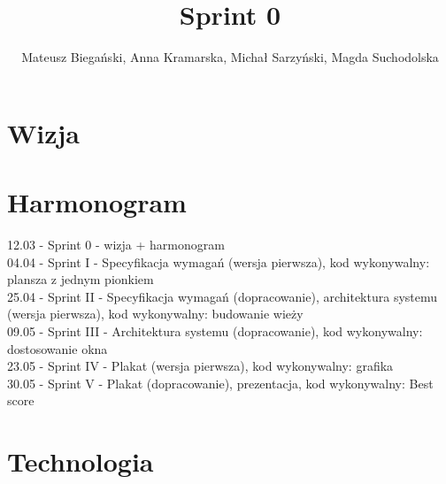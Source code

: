 \documentclass{article}
\begin{document}
\title{Sprint 0}

\author{Mateusz Biegański, Anna Kramarska, Michał Sarzyński, Magda Suchodolska}
\maketitle

\section{Wizja}

\section{Harmonogram}

12.03 - Sprint 0 - wizja + harmonogram
\\04.04 - Sprint I - Specyfikacja wymagań (wersja pierwsza), kod wykonywalny: plansza z jednym pionkiem
\\25.04 - Sprint II - Specyfikacja wymagań (dopracowanie), architektura systemu (wersja pierwsza), kod wykonywalny: budowanie wieży
\\09.05 - Sprint III - Architektura systemu (dopracowanie), kod wykonywalny: dostosowanie okna
\\23.05 - Sprint IV - Plakat (wersja pierwsza), kod wykonywalny: grafika
\\30.05 - Sprint V - Plakat (dopracowanie), prezentacja, kod wykonywalny: Best score

\section{Technologia}
\end{document}

